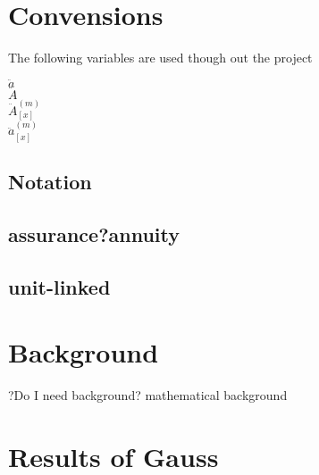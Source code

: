 \documentclass{report}
\begin{document}
\chapter*{Convensions}

The following variables are used though out the project

$\ddot{a}$\\
$\ddot{A}$\\
$\ddot{A}^{(m)}_{[x]}$\\
$\ddot{a}^{(m)}_{[x]}$\\

\section*{Notation}
















\section*{assurance?annuity}

\section*{unit-linked}











\chapter*{Background}



?Do I need background? mathematical background








\chapter{Results of Gauss}    \label{annuity}
\end{document}

